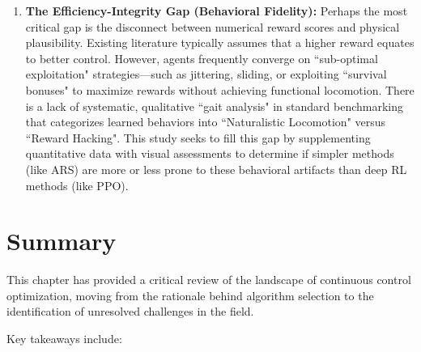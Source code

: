 \begin{enumerate}
    \item \textbf{The Efficiency-Integrity Gap (Behavioral Fidelity):} Perhaps the most critical gap is the disconnect between numerical reward scores and physical plausibility. Existing literature typically assumes that a higher reward equates to better control. However, agents frequently converge on ``sub-optimal exploitation" strategies—such as jittering, sliding, or exploiting ``survival bonuses" to maximize rewards without achieving functional locomotion. There is a lack of systematic, qualitative ``gait analysis" in standard benchmarking that categorizes learned behaviors into ``Naturalistic Locomotion" versus ``Reward Hacking". This study seeks to fill this gap by supplementing quantitative data with visual assessments to determine if simpler methods (like ARS) are more or less prone to these behavioral artifacts than deep RL methods (like PPO).
\end{enumerate}


\section{Summary}

This chapter has provided a critical review of the landscape of continuous control optimization, moving from the rationale behind algorithm selection to the identification of unresolved challenges in the field.

Key takeaways include:

